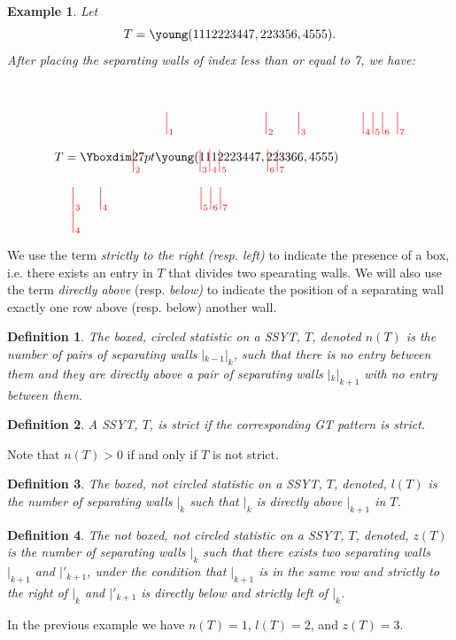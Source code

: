\documentclass[11pt]{amsart}
\newtheorem{definition}{Definition}[section]
\newtheorem{example}{Example}[section]
\begin{document}
{\begin{example}
\emph{Let} \[ T=\young(1112223447,223356,4555).\]
\emph{After placing the separating walls of index less than or equal to 7, we have:}
\begin{figure}[h]
$$T=\mathrlap{\Yboxdim27pt\young(1112223447,223366,4555)}\begin{matrix}\\ \\ \kern2.4cm\textcolor{red}{\Big|_{1}}& \kern2.2cm \textcolor{red}{\Big|_{2}}& \kern.3cm \textcolor{red}{\Big|_{3}}&\kern1.2cm \textcolor{red}{\Big|_{4}}\textcolor{red}{\Big|_{5}}\textcolor{red}{\Big|_{6}} & \kern-.2cm\textcolor{red}{\Big|_{7}}\\ & &&& \\ \kern.5cm\textcolor{red}{\Big|_{2}}& \kern-1cm\textcolor{red}{\Big|_{3}}\textcolor{red}{\Big|_{4}}\textcolor{red}{\Big|_{5}}&&\kern-4.5cm\textcolor{red}{\Big|_{6}}\textcolor{red}{\Big|_{7}}&\\  \\\kern-2.9cm\textcolor{red}{\Big|_{3}} & \kern-7.2cm\textcolor{red}{\Big|_{4}}&\kern-4.7cm \textcolor{red}{\Big|_{5}}\textcolor{red}{\Big|_{6}}\textcolor{red}{\Big|_{7}}\\ \kern-2.9cm\textcolor{red}{\Big|_{4}}\end{matrix}$$
\end{figure}
\end{example}
We use the term \emph{strictly to the right (resp. left)} to indicate the presence of a box, i.e. there exists an entry in $T$ that divides two spearating walls. We will also use the term \emph{directly above} (resp. \emph{below)} to indicate the position of a separating wall exactly one row above (resp. below) another wall.
\begin{definition}
The \emph{boxed, circled statistic} on a SSYT, $T$, denoted $n(T)$ is the number of pairs of separating walls $|_{k-1}|_{k}$, such that there is no entry between them and they are directly above a pair of separating walls $|_{k}|_{k+1}$ with no entry between them.
\end{definition}
\begin{definition}
A SSYT, $T$, is \emph{strict} if the corresponding GT pattern is strict. 
\end{definition}
Note that $n(T)>0$ if and only if $T$ is not strict. 
\begin{definition}
The \emph{boxed, not circled statistic} on a SSYT, $T$,  denoted, $l(T)$ is the number of separating walls $|_{k}$ such that $|_{k}$ is directly above $|_{k+1}$ in $T$.
\end{definition}
\begin{definition}
The \emph{not boxed, not circled statistic} on a SSYT, $T$, denoted, $z(T)$ is the number of separating walls $|_{k}$ such that there exists two separating walls $|_{k+1}$ and $ |'_{k+1}$, under the condition that $|_{k+1}$ is in the same row and strictly to the right of $|_{k}$ and $|'_{k+1}$ is directly below and strictly left of $|_{k}$.
\end{definition}
In the previous example we have $n(T)=1$, $l(T)=2$, and $z(T)=3$.


}
\end{document}

